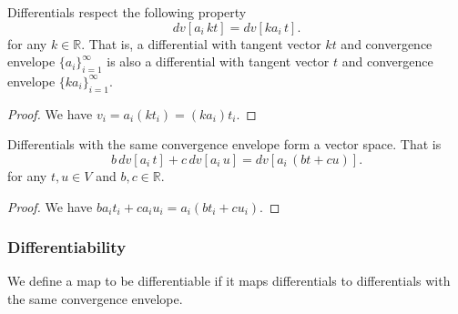 \documentclass[11pt,letterpaper,fleqn]{memoir}
\begin{document}
\begin{prop}
	Differentials respect the following property
	$$ dv[a_i \, kt] = dv[k a_i \, t].$$
	for any $k \in \mathbb{R}$. That is, a differential with tangent vector $kt$ and convergence envelope $\{a_i\}_{i=1}^{\infty}$ is also a differential with tangent vector $t$ and convergence envelope $\{ka_i\}_{i=1}^{\infty}$.
\end{prop}

\begin{proof}
	We have $v_i = a_i (k t_i) = (k a_i) t_i$.
\end{proof}

\begin{prop}
	Differentials with the same convergence envelope form a vector space. That is
	$$ b \, dv[a_i \, t] + c \, dv[a_i \, u] = dv[a_i \, (bt+cu)].$$
	for any $t,u \in V$ and $b,c \in \mathbb{R}$.
\end{prop}

\begin{proof}
	We have $b a_i t_i + c a_i u_i = a_i (b t_i + c u_i)$.
\end{proof}

\iffalse

\begin{prop}
	Let $\{v_i\}_{i=1}^{\infty}$ be a directionally convergent sequence with tangent vector $v$ and rate of convergence $\{a_i\}_{i=1}^{\infty}$. Let $\{b_i\}_{i=1}^{\infty}$ be a convergence envelope that converges at the same rate of $\{a_i\}_{i=1}^{\infty}$. Then $\{v_i\}_{i=1}^{\infty}$ is also a directionally convergent sequence with tangent vector $v$ and rate of convergence $\{b_i\}_{i=1}^{\infty}$.
\end{prop}

\begin{proof}
	Note that 
	$$ \lim\limits_{i \to \infty} \frac{v_i}{b_i} = \lim\limits_{i \to \infty} \frac{v_i}{a_i}\frac{a_i}{b_i} = \lim\limits_{i \to \infty} \frac{v_i}{a_i} \lim\limits_{i \to \infty} \frac{a_i}{b_i} = \lim\limits_{i \to \infty} \frac{v_i}{a_i}.$$
	Therefore all convergence envelopes that converge at the same rate will yield the same results.
\end{proof}

\fi

\subsubsection{Differentiability}

We define a map to be differentiable if it maps differentials to differentials with the same convergence envelope.
\end{document}
